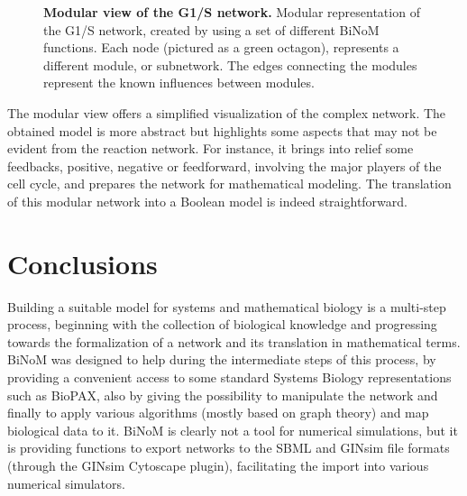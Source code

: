 \documentclass[10pt]{bmc_article}
\newenvironment{bmcformat}{\baselineskip20pt\sloppy\setboolean{publ}{false}}{\baselineskip20pt\sloppy}
\begin{document}
\begin{bmcformat}
\begin{figure}[h]
 \caption{\label{g1smodular}  \textbf{Modular view of the G1/S network.}
	Modular representation of the G1/S network, created by using a set of
different BiNoM functions. Each node (pictured as a green octagon), represents a
different module, or subnetwork. The edges connecting the modules represent the
 known influences between modules. }
\end{figure}

The modular view offers a simplified visualization of the complex network. The
obtained model is more abstract but highlights some aspects that may not be
evident from the reaction network. For instance, it brings into relief some
feedbacks, positive, negative or feedforward, involving the major players of the
cell cycle, and prepares the network for mathematical modeling. The translation
of this modular network into a Boolean model is indeed straightforward. 

\section*{Conclusions}

Building a suitable model for systems and mathematical biology is a multi-step
process, beginning with the collection of biological knowledge and progressing
towards the formalization of a network and its translation in mathematical
terms. BiNoM was designed to help during the intermediate steps of this process,
by providing a convenient access to some standard Systems Biology
representations such as BioPAX, also by giving the possibility to manipulate the
network and finally to apply various algorithms (mostly based on graph theory)
and map biological data to it. BiNoM is clearly not a tool for numerical
simulations, but it is providing functions to export networks to the SBML and
GINsim file formats (through the GINsim Cytoscape plugin), facilitating the
import into various numerical simulators.


\end{bmcformat}
\end{document}
